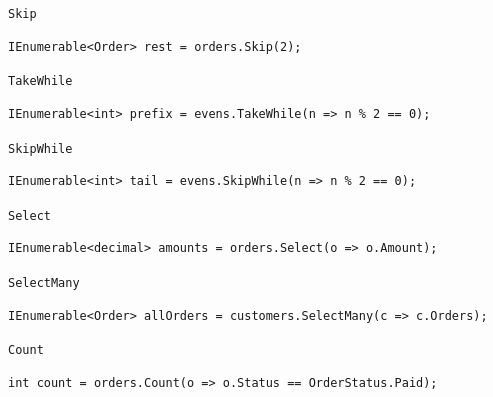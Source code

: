 \documentclass[aspectratio=169,10pt,t]{beamer}
\begin{document}
\begin{frame}[fragile]{\texttt{Skip}}
  \slidetop
\begin{lstlisting}[style=csharp,basicstyle=\ttfamily\small]
IEnumerable<Order> rest = orders.Skip(2);
\end{lstlisting}
\end{frame}

\begin{frame}[fragile]{\texttt{TakeWhile}}
  \slidetop
\begin{lstlisting}[style=csharp,basicstyle=\ttfamily\small]
IEnumerable<int> prefix = evens.TakeWhile(n => n % 2 == 0);
\end{lstlisting}
\end{frame}

\begin{frame}[fragile]{\texttt{SkipWhile}}
  \slidetop
\begin{lstlisting}[style=csharp,basicstyle=\ttfamily\small]
IEnumerable<int> tail = evens.SkipWhile(n => n % 2 == 0);
\end{lstlisting}
\end{frame}

\begin{frame}[fragile]{\texttt{Select}}
  \slidetop
\begin{lstlisting}[style=csharp,basicstyle=\ttfamily\small]
IEnumerable<decimal> amounts = orders.Select(o => o.Amount);
\end{lstlisting}
\end{frame}

\begin{frame}[fragile]{\texttt{SelectMany}}
  \slidetop
\begin{lstlisting}[style=csharp,basicstyle=\ttfamily\small]
IEnumerable<Order> allOrders = customers.SelectMany(c => c.Orders);
\end{lstlisting}
  \slidegap
\end{frame}

\begin{frame}[fragile]{\texttt{Count}}
  \slidetop
\begin{lstlisting}[style=csharp,basicstyle=\ttfamily\small]
int count = orders.Count(o => o.Status == OrderStatus.Paid);
\end{lstlisting}
\end{frame}
\end{document}
